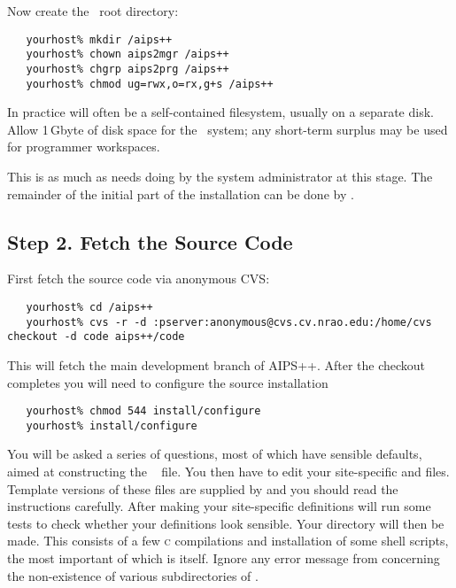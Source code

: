 Now create the \aipspp\ root directory:

\begin{verbatim}
   yourhost% mkdir /aips++
   yourhost% chown aips2mgr /aips++
   yourhost% chgrp aips2prg /aips++
   yourhost% chmod ug=rwx,o=rx,g+s /aips++
\end{verbatim}

\noindent
In practice  will often be a self-contained filesystem, usually
on a separate disk.  Allow 1\,Gbyte of disk space for the \aipspp\ system; any
short-term surplus may be used for programmer workspaces.

This is as much as needs doing by the system administrator at this stage.  The
remainder of the initial part of the installation can be done by
.

\subsection*{Step 2. Fetch the Source Code}

First fetch the source code via anonymous CVS:

\begin{verbatim}
   yourhost% cd /aips++
   yourhost% cvs -r -d :pserver:anonymous@cvs.cv.nrao.edu:/home/cvs checkout -d code aips++/code
\end{verbatim}

\noindent
This will fetch the main development branch of AIPS++. After the checkout completes you will
need to configure the source installation

\begin{verbatim}
   yourhost% chmod 544 install/configure
   yourhost% install/configure
\end{verbatim}

\noindent
You will be asked a series of questions, most of which have sensible defaults,
aimed at constructing the \aipspp\  file.  You then have to
edit your site-specific  and  files.  Template
versions of these files are supplied by  and you should read
the instructions carefully.  After making your site-specific definitions
 will run some tests to check whether your 
definitions look sensible.  Your  directory will then be made.
This consists of a few \textsc{c} compilations and installation of some shell
scripts, the most important of which is  itself.  Ignore any
error message from  concerning the non-existence of various
subdirectories of .

